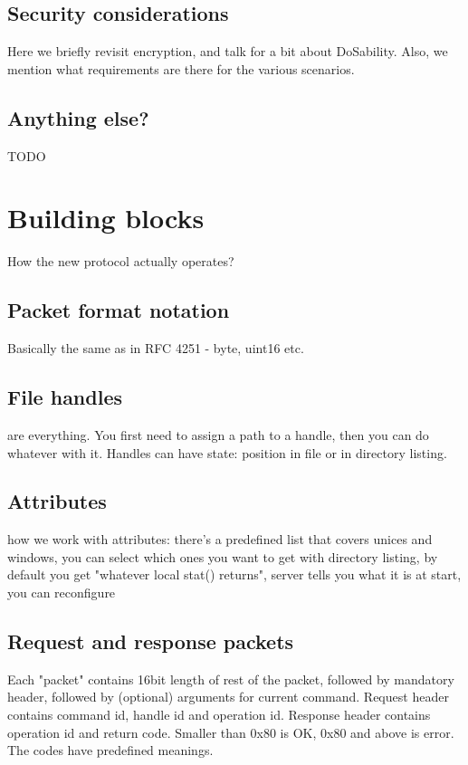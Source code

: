 \subsection{Security considerations}

Here we briefly revisit encryption, and talk for a bit about DoSability. Also, we mention what requirements
are there for the various scenarios.

\subsection{Anything else?}

TODO


\section{Building blocks}

How the new protocol actually operates?

\subsection{Packet format notation}

Basically the same as in RFC 4251 - byte, uint16 etc.

\subsection{File handles}

are everything. You first need to assign a path to a handle, then you can do whatever with it. Handles can
have state: position in file or in directory listing.

\subsection{Attributes}

how we work with attributes: there's a predefined list that covers unices and windows, you can select which
ones you want to get with directory listing, by default you get "whatever local stat() returns", server tells
you what it is at start, you can reconfigure

\subsection{Request and response packets}

Each "packet" contains 16bit length of rest of the packet, followed by mandatory header, followed by
(optional) arguments for current command. Request header contains command id, handle id and operation id.
Response header contains operation id and return code. Smaller than 0x80 is OK, 0x80 and above is error. The
codes have predefined meanings.

